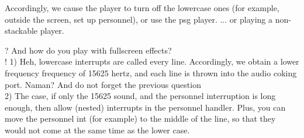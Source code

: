 Accordingly, we cause the player to turn off the lowercase ones (for
example, outside the screen, set up personnel), or use the psg player.
... or playing a non-stackable player.

? And how do you play with fullscreen effects?\\
! 1) Heh, lowercase interrupts are called every line. Accordingly, we
obtain a lower frequency frequency of 15625 hertz, and each line is
thrown into the audio coking port. Naman? And do not forget the
previous question\\
2) The case, if only the 15625 sound, and the personnel interruption
is long enough, then allow (nested) interrupts in the personnel
handler. Plus, you can move the personnel int (for example) to the
middle of the line, so that they would not come at the same time as
the lower case.
